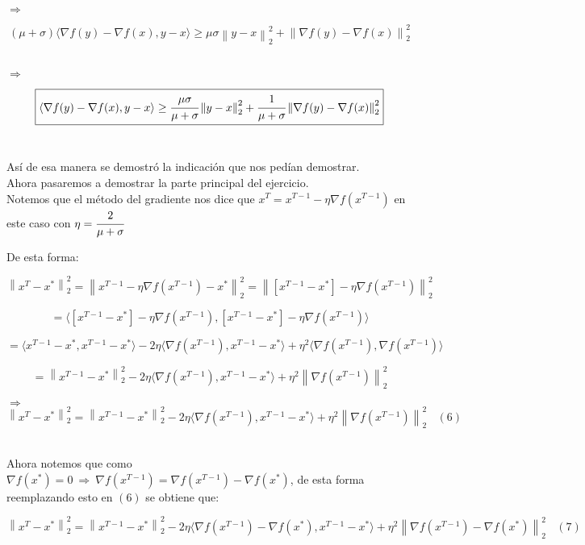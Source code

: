 \documentclass[11pt]{article}
\begin{document}
$ \Rightarrow $ 

\[ (\mu + \sigma) \langle \nabla f(y) - \nabla f(x) , y - x \rangle  \geq  \mu \sigma \left\| y-x \right\|_2^2 + \left\| \nabla f(y) - \nabla f(x) \right\|_2^2  \] \

$ \Rightarrow $ 

\[ \boxed{\langle \nabla f(y) - \nabla f(x) , y - x \rangle  \geq  \cfrac{\mu \sigma}{\mu + \sigma} \left\| y-x \right\|_2^2 + \cfrac{1}{\mu + \sigma}\left\| \nabla f(y) - \nabla f(x) \right\|_2^2}  \] \

Así de esa manera se demostró la indicación que nos pedían demostrar. \\

Ahora pasaremos a demostrar la parte principal del ejercicio. \\

Notemos que el método del gradiente nos dice que $ x^T = x^{T-1} - \eta \nabla f(x^{T-1}) $ en este caso con $ \eta = \cfrac{2}{\mu + \sigma} $ \\

$ \ $ 

De esta forma: 

\[ \left\| x^T - x^{*} \right\|_2^2 = \left\| x^{T-1} - \eta \nabla f(x^{T-1}) - x^{*} \right\|_2^2 = \left\| [x^{T-1} - x^{*}] - \eta \nabla f(x^{T-1})  \right\|_2^2  \]

\[ = \langle [x^{T-1} - x^{*}] - \eta \nabla f(x^{T-1}), [x^{T-1} - x^{*}] - \eta \nabla f(x^{T-1}) \rangle \]

\[ = \langle x^{T-1} - x^{*}, x^{T-1} - x^{*} \rangle - 2 \eta \langle \nabla f(x^{T-1}), x^{T-1} - x^{*} \rangle + \eta^2 \langle \nabla f(x^{T-1}), \nabla f(x^{T-1}) \rangle  \]

\[ = \left\| x^{T-1} - x^{*} \right\|_2^2 - 2 \eta \langle \nabla f(x^{T-1}), x^{T-1} - x^{*} \rangle + \eta^2 \left\| \nabla f(x^{T-1}) \right\|_2^2  \]

$ \Rightarrow $ \\

\[ \left\| x^T - x^{*} \right\|_2^2 = \left\| x^{T-1} - x^{*} \right\|_2^2 - 2 \eta \langle \nabla f(x^{T-1}), x^{T-1} - x^{*} \rangle + \eta^2 \left\| \nabla f(x^{T-1}) \right\|_2^2  \ \ \ \ (6) \] \

Ahora notemos que como $ \nabla f(x^{*}) = 0 \ \Rightarrow \ \nabla f(x^{T-1}) = \nabla f(x^{T-1}) - \nabla f(x^{*})$, de esta forma reemplazando esto en $(6)$ se obtiene que: 

\[ \left\| x^T - x^{*} \right\|_2^2 = \left\| x^{T-1} - x^{*} \right\|_2^2 - 2 \eta \langle \nabla f(x^{T-1}) - \nabla f(x^{*}) , x^{T-1} - x^{*} \rangle + \eta^2 \left\| \nabla f(x^{T-1}) - \nabla f(x^{*}) \right\|_2^2  \ \ \ \ (7) \] \
\end{document}
